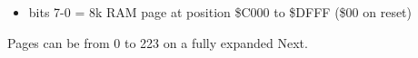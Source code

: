 \begin{itemize}
\item bits 7-0 = 8k RAM page at position \$C000 to \$DFFF (\$00 on
  reset)
\end{itemize}
Pages can be from 0 to 223 on a fully expanded Next.

